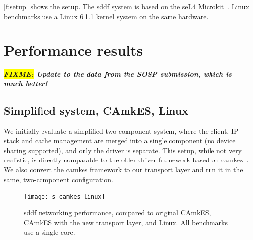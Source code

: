 \documentclass[a4paper,12pt]{report}
\newcommand{\FIXME}[1]{\textbf{\textsl{\colorbox{yellow}{FIXME:} #1}}}
\newcommand{\FIXME}[1]{\relax}
\begin{document}
\autoref{f:setup} shows the setup.
The \gls{sddf} system is based on the seL4 Microkit~\citep{microkit:url}.
Linux benchmarks use a Linux 6.1.1 kernel system on the same hardware.

\section{Performance results}
\FIXME{Update to the data from the SOSP submission, which is much better!}

\subsection{Simplified system, CAmkES, Linux}\label{s:p-camkes}

We initially evaluate a simplified two-component system, where the
client, IP stack and cache management are merged into a single component (no device
sharing supported), and only the
driver is separate. This setup, while not very realistic, is directly
comparable to the older driver framework based on
\gls{camkes}~\citep{Kuz_LGH_07}. We also convert the
\gls{camkes} framework to our transport layer and run it in the same,
two-component configuration.

\begin{figure}[th]
  \centering
  \texttt{[image: s-camkes-linux]}
  \caption[\gls{sddf} networking performance compared to other systems
  running single-core.]{\gls{sddf} networking performance, compared to original CAmkES,
    CAmkES with the new transport layer, and Linux. All benchmarks use
    a single core.}
  \label{f:s-camkes-linux}
\end{figure}
\end{document}
